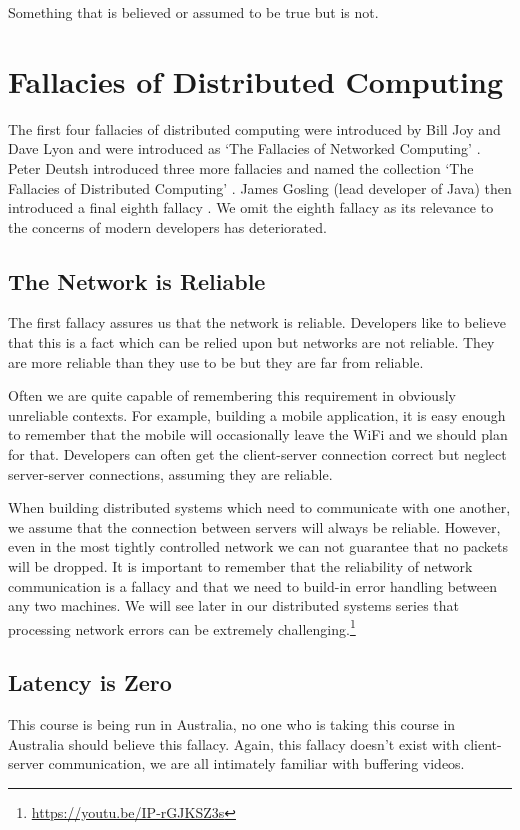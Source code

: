 \begin{definition}[Fallacy]
Something that is believed or assumed to be true but is not.
\end{definition}

\section{Fallacies of Distributed Computing}
The first four fallacies of distributed computing were introduced by Bill Joy and Dave Lyon and were introduced as `The Fallacies of Networked Computing' \cite{four-fallacies}.
Peter Deutsh introduced three more fallacies and named the collection `The Fallacies of Distributed Computing' \cite{eight-fallacies}.
James Gosling (lead developer of Java) then introduced a final eighth fallacy \cite{four-fallacies}.
We omit the eighth fallacy as its relevance to the concerns of modern developers has deteriorated.

\subsection{The Network is Reliable}
The first fallacy assures us that the network is reliable.
Developers like to believe that this is a fact which can be relied upon but networks are not reliable.
They are more reliable than they use to be but they are far from reliable.

Often we are quite capable of remembering this requirement in obviously unreliable contexts.
For example, building a mobile application,
it is easy enough to remember that the mobile will occasionally leave the WiFi and we should plan for that.
Developers can often get the client-server connection correct but neglect server-server connections,
assuming they are reliable.

When building distributed systems which need to communicate with one another,
we assume that the connection between servers will always be reliable.
However, even in the most tightly controlled network we can not guarantee that no packets will be dropped.
It is important to remember that the reliability of network communication is a fallacy and that we need to build-in error handling between any two machines.
We will see later in our distributed systems series that processing network errors can be extremely challenging.\footnote{\url{https://youtu.be/IP-rGJKSZ3s}}

\subsection{Latency is Zero}
This course is being run in Australia,
no one who is taking this course in Australia should believe this fallacy.
Again, this fallacy doesn't exist with client-server communication,
we are all intimately familiar with buffering videos.

